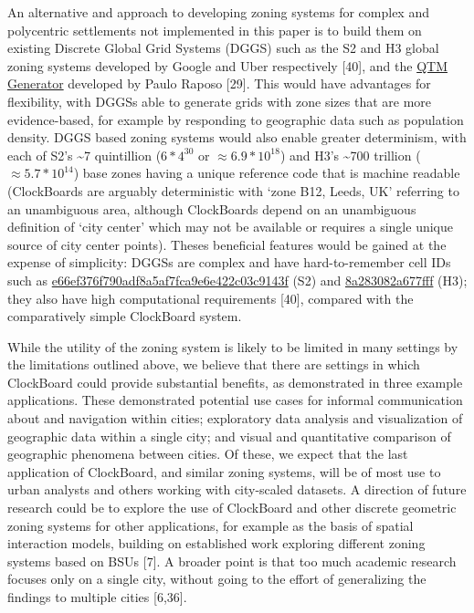 \documentclass{josis}
\begin{document}
An alternative and approach to developing zoning systems for complex and polycentric settlements not implemented in this paper is to build them on existing Discrete Global Grid Systems (DGGS) such as the S2 and H3 global zoning systems developed by Google and Uber respectively {[}40{]}, and the \href{https://github.com/paulojraposo/QTM}{QTM Generator} developed by Paulo Raposo {[}29{]}.
This would have advantages for flexibility, with DGGSs able to generate grids with zone sizes that are more evidence-based, for example by responding to geographic data such as population density.
DGGS based zoning systems would also enable greater determinism, with each of S2's \textasciitilde7 quintillion (\(6 * 4^{30}\) or \(\approx6.9*10^{18}\)) and H3's \textasciitilde700 trillion (\(\approx5.7 * 10^{14}\)) base zones having a unique reference code that is machine readable (ClockBoards are arguably deterministic with `zone B12, Leeds, UK' referring to an unambiguous area, although ClockBoards depend on an unambiguous definition of `city center' which may not be available or requires a single unique source of city center points).
Theses beneficial features would be gained at the expense of simplicity: DGGSs are complex and have hard-to-remember cell IDs such as \href{https://developers.google.com/maps/documentation/gaming/concepts_playable_locations}{e66ef376f790adf8a5af7fca9e6e422c03c9143f} (S2) and \href{https://h3geo.org/docs/quickstart}{8a283082a677fff} (H3); they also have high computational requirements {[}40{]}, compared with the comparatively simple ClockBoard system.

While the utility of the zoning system is likely to be limited in many settings by the limitations outlined above, we believe that there are settings in which ClockBoard could provide substantial benefits, as demonstrated in three example applications.
These demonstrated potential use cases for informal communication about and navigation within cities; exploratory data analysis and visualization of geographic data within a single city; and visual and quantitative comparison of geographic phenomena between cities.
Of these, we expect that the last application of ClockBoard, and similar zoning systems, will be of most use to urban analysts and others working with city-scaled datasets.
A direction of future research could be to explore the use of ClockBoard and other discrete geometric zoning systems for other applications, for example as the basis of spatial interaction models, building on established work exploring different zoning systems based on BSUs {[}7{]}.
A broader point is that too much academic research focuses only on a single city, without going to the effort of generalizing the findings to multiple cities {[}6,36{]}.
\end{document}
